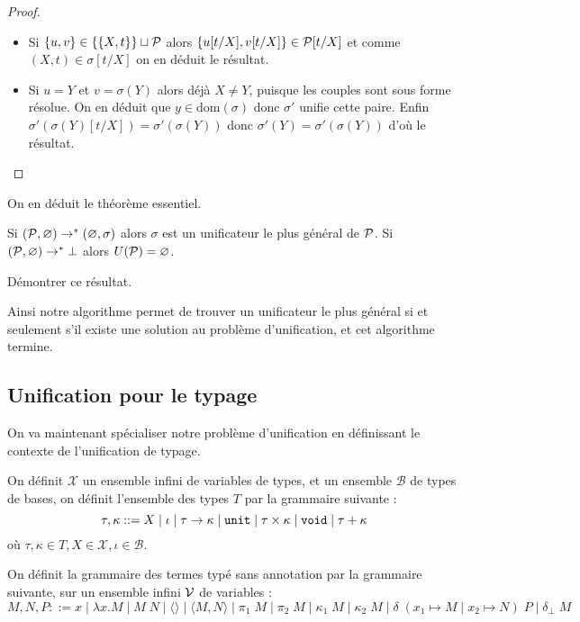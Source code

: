 \begin{proof}
\begin{itemize}[label=$\bullet$]
        \begin{itemize}[label=$\bullet$]
            \item Si $\{u,v\}\in \{\{X,t\}\}\sqcup\mathcal P$ alors $\{u[t/X],v[t/X]\} \in \mathcal P[t/X]$ et comme $(X,t)\in\sigma[t/X]$ on en déduit le résultat.
            \item Si $u = Y$ et $v = \sigma(Y)$ alors déjà $X\neq Y$, puisque les couples sont sous forme résolue. On en déduit que $y\in\mathrm{dom}(\sigma)$ donc $\sigma'$ unifie cette paire. Enfin $\sigma'(\sigma(Y)[t/X]) = \sigma'(\sigma(Y))$ donc $\sigma'(Y) = \sigma'(\sigma(Y))$ d'où le résultat.
        \end{itemize}
    \end{itemize}
\end{proof}

On en déduit le théorème essentiel.

\begin{them}
    Si $(\mathcal P,\varnothing)\to^* (\varnothing,\sigma)$ alors $\sigma$ est un unificateur le plus général de $\mathcal P$. Si $(\mathcal P,\varnothing)\to^* \bot$ alors $U(\mathcal P) = \varnothing$.
\end{them}

\begin{exo}
    Démontrer ce résultat.
\end{exo}

Ainsi notre algorithme permet de trouver un unificateur le plus général si et seulement s'il existe une solution au problème d'unification, et cet algorithme termine.

\subsection{Unification pour le typage}

On va maintenant spécialiser notre problème d'unification en définissant le contexte de l'unification de typage.

\begin{defi}
    On définit $\mathcal X$ un ensemble infini de variables de types, et un ensemble $\mathcal B$ de types de bases, on définit l'ensemble des types $T$ par la grammaire suivante : 
    $$\tau,\kappa ::= X\mid \iota\mid \tau\to\kappa\mid \texttt{unit}\mid \tau\times\kappa\mid \texttt{void}\mid \tau+\kappa$$ où $\tau,\kappa\in T, X\in\mathcal X, \iota\in\mathcal B$.
\end{defi}

\begin{defi}
    On définit la grammaire des termes typé sans annotation par la grammaire suivante, sur un ensemble infini $\mathcal V$ de variables :
    $$M,N,P ::= x\;\Bigg|\; \lambda x.M\;\Bigg|\; M\;N\;\Bigg|\; \langle\rangle\;\Bigg|\; \langle M,N\rangle\;\Bigg|\; \pi_1\;M\;\Bigg|\; \pi_2\;M\;\Bigg|\; \kappa_1\;M\;\Bigg|\; \kappa_2\;M\;\Bigg|\; \delta\;(x_1\mapsto M\mid x_2\mapsto N)\;P\;\Bigg|\;\delta_\bot\;M$$
\end{defi}

